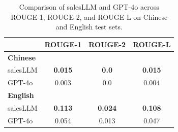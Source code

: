 
\begin{table}[t]
\centering
\small
\setlength{\tabcolsep}{4pt}
\begin{tabular}{lccc}
\toprule
& \textbf{ROUGE-1} & \textbf{ROUGE-2} & \textbf{ROUGE-L} \\
\midrule
\textbf{Chinese} \\
\quad salesLLM & \textbf{0.015} & \textbf{0.0} &\textbf{0.015}  \\
\quad GPT-4o   &0.003  &0.0  &0.004  \\
\addlinespace
\textbf{English} \\
\quad salesLLM &\textbf{0.113}&\textbf{0.024} &\textbf{0.108} \\
\quad GPT-4o   & 0.054& 0.013 & 0.047 \\
\bottomrule
\end{tabular}
\caption{Comparison of salesLLM and GPT-4o across ROUGE-1, ROUGE-2, and ROUGE-L on Chinese and English test sets.}
\label{tab:rouge_lcs_compact}
\end{table}